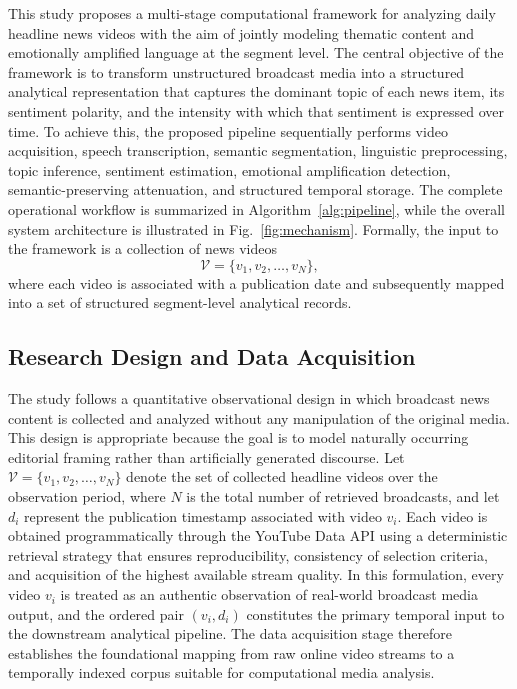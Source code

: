 \documentclass[final,1p,times]{elsarticle}
\begin{document}
This study proposes a multi-stage computational framework for analyzing daily headline news videos with the aim of jointly modeling thematic content and emotionally amplified language at the segment level. The central objective of the framework is to transform unstructured broadcast media into a structured analytical representation that captures the dominant topic of each news item, its sentiment polarity, and the intensity with which that sentiment is expressed over time. To achieve this, the proposed pipeline sequentially performs video acquisition, speech transcription, semantic segmentation, linguistic preprocessing, topic inference, sentiment estimation, emotional amplification detection, semantic-preserving attenuation, and structured temporal storage. The complete operational workflow is summarized in Algorithm~\ref{alg:pipeline}, while the overall system architecture is illustrated in Fig.~\ref{fig:mechanism}. Formally, the input to the framework is a collection of news videos
\begin{equation}
\mathcal{V} = \{v_1, v_2, \dots, v_N\},
\end{equation}
where each video is associated with a publication date and subsequently mapped into a set of structured segment-level analytical records.

\subsection{Research Design and Data Acquisition}

The study follows a quantitative observational design in which broadcast news content is collected and analyzed without any manipulation of the original media. This design is appropriate because the goal is to model naturally occurring editorial framing rather than artificially generated discourse. Let $\mathcal{V}=\{v_1,v_2,\dots,v_N\}$ denote the set of collected headline videos over the observation period, where $N$ is the total number of retrieved broadcasts, and let $d_i$ represent the publication timestamp associated with video $v_i$. Each video is obtained programmatically through the YouTube Data API using a deterministic retrieval strategy that ensures reproducibility, consistency of selection criteria, and acquisition of the highest available stream quality. In this formulation, every video $v_i$ is treated as an authentic observation of real-world broadcast media output, and the ordered pair $(v_i,d_i)$ constitutes the primary temporal input to the downstream analytical pipeline. The data acquisition stage therefore establishes the foundational mapping from raw online video streams to a temporally indexed corpus suitable for computational media analysis.
\end{document}
